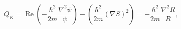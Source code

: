 \begin{equation}
Q_{K}=\operatorname{Re}\left(  -\frac{\hbar^{2}}{2m}\frac{\nabla^{2}\psi}%
{\psi}\right)  -\left(  \frac{\hbar^{2}}{2m}\left(  \nabla S\right)
^{2}\right)  =-\frac{\hbar^{2}}{2m}\frac{\nabla^{2}R}{R},\label{41}%
\end{equation}

